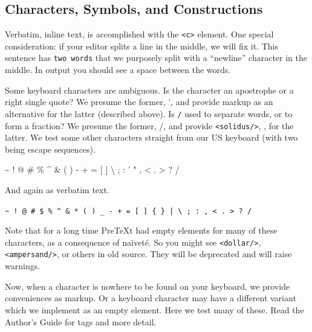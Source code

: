 \documentclass[pdflatex]{sn-jnl}
\theoremstyle{thmstyleone}%
\theoremstyle{thmstyletwo}%
\theoremstyle{thmstylethree}%
\newcommand{\mono}[1]{\texttt{#1}}
\newcommand{\swungdash}{\raisebox{-2.25ex}{\scalebox{2}{\~{}}}}
\numberwithin{equation}{section}
\begin{document}
\subsection{Characters, Symbols, and Constructions}\label{section-text-paragraphs-8}%
Verbatim, inline text, is accomplished with the \mono{<c>} element.  One special consideration: if your editor splits a line in the middle, we will fix it.  This sentence has \mono{two words} that we purposely split with a ``newline'' character in the middle.  In output you should see a space between the words.%
\par
Some keyboard characters are ambiguous.  Is the character \mono{\textquotesingle{}} an apostrophe or a right single quote?  We presume the former, ', and provide markup as an alternative for the latter (described above).  Is \mono{/} used to separate words, or to form a fraction?  We presume the former, \slash{}, and provide \mono{<solidus/>}, \textfractionsolidus{}, for the latter.  We test some other characters straight from our US keyboard (with two being escape sequences).%
\par
\textasciitilde{} \textasciigrave{} ! @ \# \textdollar{} \% \textasciicircum{} \& \textasteriskcentered{} ( ) \textunderscore{} - + = [ ] \textbraceleft{} \textbraceright{} \textbar{} \textbackslash{} ; : ' " , \textless{} . \textgreater{} ? \slash{}%
\par
And again  as verbatim text.%
\par
\mono{\textasciitilde{} \textasciigrave{} ! @ \# \$ \% \textasciicircum{} \& * ( ) \_ - + = [ ] \{ \} | \textbackslash{} ; : \textquotesingle{} \textquotedbl{} , < . > ? /}%
\par
Note that for a long time PreTeXt had empty elements for many of these characters, as a consequence of naïveté.  So you might see \mono{<dollar/>}, \mono{<ampersand/>}, or others in old source.  They will be deprecated and will raise warnings.%
\par
Now, when a character is nowhere to be found on your keyboard, we provide conveniences as markup.  Or a keyboard character may have a different variant which we implement as an empty element.  Here we test many of these.  Read the Author's Guide for tags and more detail.%
\par
\textcopyright{}~~ \textcircledP{}~~ \textcopyleft{}~~ \textregistered{}~~ \texttrademark{}~~ \textservicemark{}~~ \textellipsis{}~~ \textperiodcentered{}~~ \swungdash{}~~ \textperthousand{}~~ \textpilcrow{}~~ \textsection{}~~ \textminus{}~~ \texttimes{}~~ \textfractionsolidus{}~~ \textdiv{}~~ \textpm{}%
\end{document}
